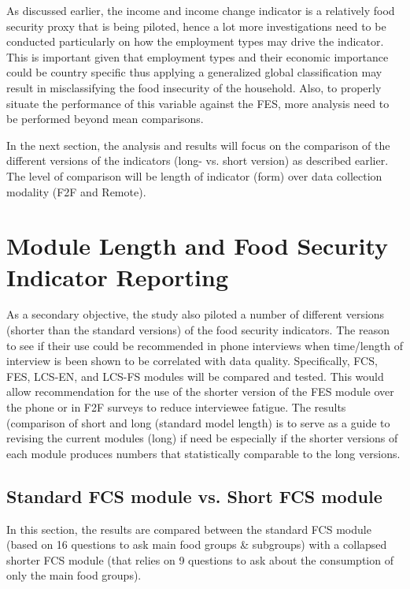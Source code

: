 \documentclass[11pt,harvard]{article}
\begin{document}
As discussed earlier, the income and income change indicator is a relatively food security proxy that is being piloted, hence a lot more investigations need to be conducted particularly on how the employment types may drive the indicator. This is important given that employment types and their economic importance could be country specific thus applying a generalized global classification may result in misclassifying the food insecurity of the household. Also, to properly situate the performance of this variable against the FES, more analysis need to be performed beyond mean comparisons.


In the next section, the analysis and results will focus on the comparison of the different versions of the indicators (long- vs. short version) as described earlier. The level of comparison will be length of indicator (form) over data collection modality (F2F and Remote). 

\pagebreak
	
\section{Module Length and Food Security Indicator Reporting}

As a secondary objective, the study also piloted a number of different versions (shorter than the standard versions) of the food security indicators. The reason to see if their use could be recommended in phone interviews when time/length of interview is been shown to be correlated with data quality. Specifically, FCS, FES, LCS-EN, and LCS-FS modules will be compared and tested. This would allow recommendation for the use of the shorter version of the FES module over the phone or in F2F surveys to reduce interviewee fatigue. The results (comparison of short and long (standard model length) is to serve as a guide to revising the current modules (long) if need be especially if the shorter versions of each module produces numbers that statistically comparable to the long versions. 


\subsection{Standard FCS module vs. Short FCS module}

In this section, the results are compared between the standard FCS module (based on 16 questions to ask main food groups \& subgroups) with a collapsed shorter FCS module (that relies on 9 questions to ask about the consumption of only the main food groups).
\end{document}
